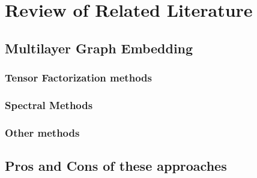 \chapter{Review of Related Literature} 

\label{chapter:chapter2}

\section{Multilayer Graph Embedding}
\subsection{Tensor Factorization methods}

\subsection{Spectral Methods}

\subsection{Other methods}

\section{Pros and Cons of these approaches}







